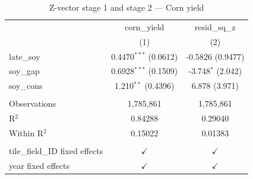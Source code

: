 
\begin{table}[H]
   \caption{\label{tab:zvector} Z-vector stage 1 and stage 2 — Corn yield}
   \bigskip
   \centering
   \begin{tabular}{lcc}
      \toprule
                                      & corn\_yield             & resid\_sq\_z\\    
                                      & (1)                     & (2)\\  
      \midrule 
      late\_soy                       & 0.4470$^{***}$ (0.0612) & -0.5826 (0.9477)\\   
      soy\_gap                        & 0.6928$^{***}$ (0.1509) & -3.748$^{*}$ (2.042)\\   
      soy\_cons                       & 1.210$^{**}$ (0.4396)   & 6.878 (3.971)\\   
       \\
      Observations                    & 1,785,861               & 1,785,861\\  
      R$^2$                           & 0.84288                 & 0.29040\\  
      Within R$^2$                    & 0.15022                 & 0.01383\\  
       \\
      tile\_field\_ID fixed effects   & $\checkmark$            & $\checkmark$\\   
      year fixed effects              & $\checkmark$            & $\checkmark$\\   
      \bottomrule
   \end{tabular}
\end{table}


